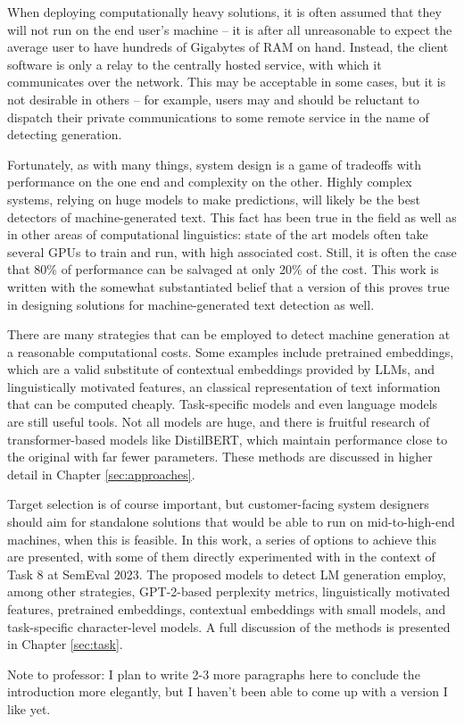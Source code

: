 When deploying computationally heavy solutions, it is often assumed that they will not run on the end user's machine -- it is after all unreasonable to expect the average user to have hundreds of Gigabytes of RAM on hand.
Instead, the client software is only a relay to the centrally hosted service, with which it communicates over the network.
This may be acceptable in some cases, but it is not desirable in others -- for example, users may and should be reluctant to dispatch their private communications to some remote service in the name of detecting generation.

Fortunately, as with many things, system design is a game of tradeoffs with performance on the one end and complexity on the other.
Highly complex systems, relying on huge models to make predictions, will likely be the best detectors of machine-generated text.
This fact has been true in the field as well as in other areas of computational linguistics: state of the art models often take several GPUs to train and run, with high associated cost.
Still, it is often the case that 80\% of performance can be salvaged at only 20\% of the cost.
This work is written with the somewhat substantiated belief that a version of this proves true in designing solutions for machine-generated text detection as well.

There are many strategies that can be employed to detect machine generation at a reasonable computational costs.
Some examples include pretrained embeddings, which are a valid substitute of contextual embeddings provided by LLMs, and linguistically motivated features, an classical representation of text information that can be computed cheaply.
Task-specific models and even language models are still useful tools.
Not all models are huge, and there is fruitful research of transformer-based models like DistilBERT, which maintain performance close to the original with far fewer parameters.
These methods are discussed in higher detail in Chapter \ref{sec:approaches}.

Target selection is of course important, but customer-facing system designers should aim for standalone solutions that would be able to run on mid-to-high-end machines, when this is feasible.
In this work, a series of options to achieve this are presented, with some of them directly experimented with in the context of Task 8 at SemEval 2023.
The proposed models to detect LM generation employ, among other strategies, GPT-2-based perplexity metrics, linguistically motivated features, pretrained embeddings, contextual embeddings with small models, and task-specific character-level models.
A full discussion of the methods is presented in Chapter \ref{sec:task}.

Note to professor: I plan to write 2-3 more paragraphs here to conclude the introduction more elegantly, but I haven't been able to come up with a version I like yet.